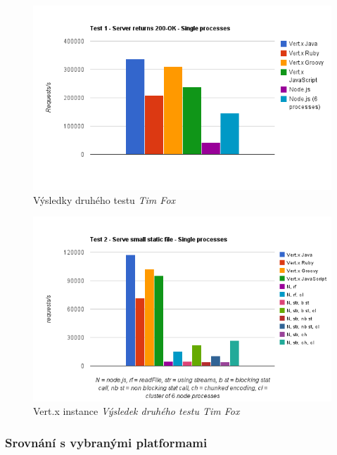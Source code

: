 \begin{figure}
\begin{centering}
\includegraphics[scale=0.7]{obrazky/chart_1}
\par\end{centering}
\caption{Výsledky druhého testu \emph{Tim Fox} \label{fig:test1}}
\end{figure}

\begin{figure}
\begin{centering}
\includegraphics[scale=0.7]{obrazky/chart_3-5}
\par\end{centering}
\caption{Vert.x instance \emph{Výsledek druhého testu Tim Fox} \label{fig:test2}}
\end{figure}

\subsubsection{Srovnání s vybranými platformami}

